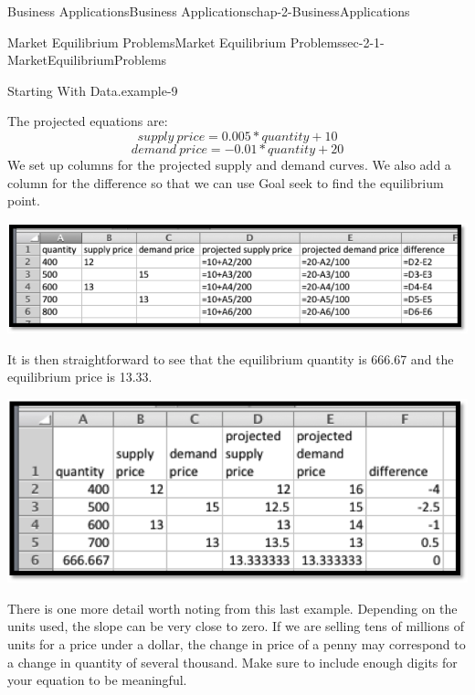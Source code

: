 \documentclass[oneside,10pt,]{book}
\numberwithin{equation}{section}
\begin{document}
\begin{chapterptx}{Business Applications}{}{Business Applications}{}{}{chap-2-BusinessApplications}
\begin{sectionptx}{Market Equilibrium Problems}{}{Market Equilibrium Problems}{}{}{sec-2-1-MarketEquilibriumProblems}
\begin{example}{Starting With Data.}{example-9}
%
\par
\hypertarget{p-574}{}%
The projected equations are:%
%
\begin{equation*}
supply\ price=0.005*quantity+10
\end{equation*}
%
\begin{equation*}
demand\ price=-0.01*quantity+20
\end{equation*}
\hypertarget{p-575}{}%
We set up columns for the projected supply and demand curves.  We also add a column for the difference so that we can use Goal seek to find the equilibrium point. \leavevmode%
\begin{sidebyside}{1}{0.1}{0.1}{0}%
\begin{sbspanel}{0.8}%
\includegraphics[width=1\linewidth]{images/sec2-1-6.png}
\end{sbspanel}%
\end{sidebyside}%
 It is then straightforward to see that the equilibrium quantity is 666.67 and the equilibrium price is \textdollar{}13.33.%
\begin{sidebyside}{1}{0.1}{0.1}{0}%
\begin{sbspanel}{0.8}%
\includegraphics[width=1\linewidth]{images/sec2-1-7.png}
\end{sbspanel}%
\end{sidebyside}%
\end{example}
\hypertarget{p-576}{}%
There is one more detail worth noting from this last example.  Depending on the units used, the slope can be very close to zero.  If we are selling tens of millions of units for a price under a dollar, the change in price of a penny may correspond to a change in quantity of several thousand.  Make sure to include enough digits for your equation to be meaningful.%

\end{sectionptx}
\end{chapterptx}
\end{document}
